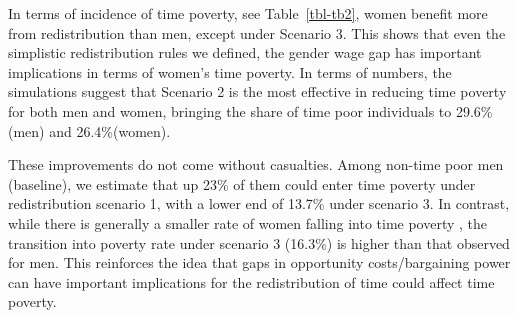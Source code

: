 \documentclass[
  11pt,
]{article}
\begin{document}
\begin{table}

\caption{\label{tbl-tb2}Time Poverty and Transition Rates}


\end{table}%

In terms of incidence of time poverty, see Table~\ref{tbl-tb2}, women
benefit more from redistribution than men, except under Scenario 3. This
shows that even the simplistic redistribution rules we defined, the
gender wage gap has important implications in terms of women's time
poverty. In terms of numbers, the simulations suggest that Scenario 2 is
the most effective in reducing time poverty for both men and women,
bringing the share of time poor individuals to 29.6\% (men) and
26.4\%(women).

These improvements do not come without casualties. Among non-time poor
men (baseline), we estimate that up 23\% of them could enter time
poverty under redistribution scenario 1, with a lower end of 13.7\%
under scenario 3. In contrast, while there is generally a smaller rate
of women falling into time poverty , the transition into poverty rate
under scenario 3 (16.3\%) is higher than that observed for men. This
reinforces the idea that gaps in opportunity costs/bargaining power can
have important implications for the redistribution of time could affect
time poverty.
\end{document}
